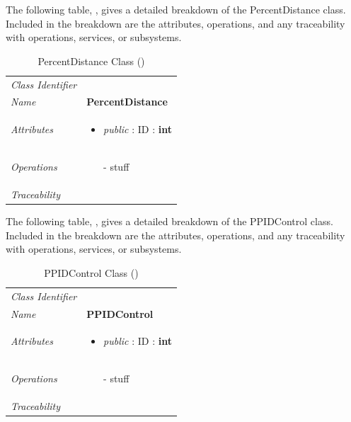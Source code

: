 \documentclass[12pt,letterpaper]{article}
\begin{document}
The following table, , gives a detailed breakdown of the PercentDistance class. Included in the breakdown are the attributes, operations, and any traceability with operations, services, or subsystems.

\begin{table}[H]
    \caption{PercentDistance Class ()} 
	\begin{tabu} to 
		\toprule
		Class Identifier &  \\
		Name & {\bf PercentDistance} \\
		Attributes & 
		\begin{minipage}[t]{\linewidth}
		    \begin{itemize}
		        \item \textit{public} : ID : \bf{int}
			\end{itemize}
	    \end{minipage} \\

		Operations &
		\begin{minipage}[t]{\linewidth}
			\begin{enumerate}
			    \item[-] stuff
	        \end{enumerate}
	    \end{minipage} \\
	    	Traceability & \\
		\toprule
	\end{tabu}
\end{table}

The following table, , gives a detailed breakdown of the PPIDControl class. Included in the breakdown are the attributes, operations, and any traceability with operations, services, or subsystems.

\begin{table}[H]
    \caption{PPIDControl Class ()} 
	\begin{tabu} to 
		\toprule
		Class Identifier &  \\
		Name & {\bf PPIDControl} \\
		Attributes & 
		\begin{minipage}[t]{\linewidth}
		    \begin{itemize}
		        \item \textit{public} : ID : \bf{int}
			\end{itemize}
	    \end{minipage} \\

		Operations &
		\begin{minipage}[t]{\linewidth}
			\begin{enumerate}
			    \item[-] stuff
	        \end{enumerate}
	    \end{minipage} \\
	    	Traceability & \\
		\toprule
	\end{tabu}
\end{table}
\end{document}
